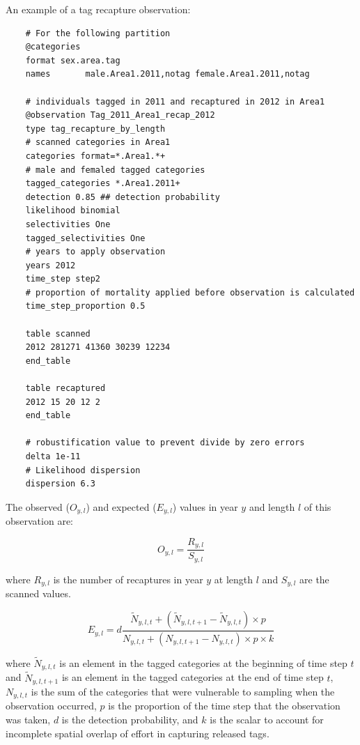 An example of a tag recapture observation:

{\small{\begin{verbatim}
	# For the following partition
	@categories
	format sex.area.tag
	names  		male.Area1.2011,notag female.Area1.2011,notag
	
	# individuals tagged in 2011 and recaptured in 2012 in Area1
	@observation Tag_2011_Area1_recap_2012
	type tag_recapture_by_length
	# scanned categories in Area1
	categories format=*.Area1.*+
	# male and femaled tagged categories
	tagged_categories *.Area1.2011+
	detection 0.85 ## detection probability
	likelihood binomial
	selectivities One
	tagged_selectivities One
	# years to apply observation
	years 2012
	time_step step2
	# proportion of mortality applied before observation is calculated
	time_step_proportion 0.5
	
	table scanned
	2012 281271 41360 30239 12234
	end_table
	
	table recaptured
	2012 15 20 12 2
	end_table
	
	# robustification value to prevent divide by zero errors
	delta 1e-11
	# Likelihood dispersion
	dispersion 6.3
\end{verbatim}}}

The observed ($O_{y,l}$) and expected ($E_{y,l}$) values in year $y$ and length $l$ of this observation are:

\begin{equation}
	O_{y,l} = \frac{R_{y,l}}{S_{y,l}}
\end{equation}

where $R_{y,l}$ is the number of recaptures in year $y$ at length $l$ and $S_{y,l}$ are the scanned values.

\begin{equation}
	E_{y,l} = d \frac{\tilde{N}_{y,l,t} +  (\tilde{N}_{y,l,t + 1} - \tilde{N}_{y,l,t}) \times p}
	{N_{y,l,t} + (N_{y,l,t+1} - N_{y,l,t}) \times p \times k}
\end{equation}

where $\tilde{N}_{y,l,t}$ is an element in the tagged categories at the beginning of time step $t$ and $\tilde{N}_{y,l,t + 1}$ is an element in the tagged categories at the end of time step $t$, $N_{y,l,t}$ is the sum of the categories that were vulnerable to sampling when the observation occurred, $p$ is the proportion of the time step that the observation was taken, $d$ is the detection probability, and $k$ is the scalar to account for incomplete spatial overlap of effort in capturing released tags.

